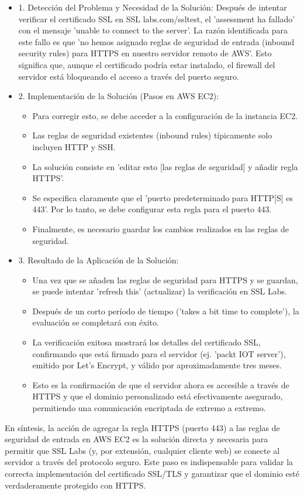 \documentclass{report}
\begin{document}
\begin{itemize}
    \item 1. Detección del Problema y Necesidad de la Solución: Después de intentar verificar el certificado SSL en SSL labs.com/ssltest, 
    el 'assessment ha fallado' con el mensaje 'unable to connect to the server'. La razón identificada para este fallo es que 'no hemos 
    asignado reglas de seguridad de entrada (inbound security rules) para HTTPS en nuestro servidor remoto de AWS'. Esto significa que, 
    aunque el certificado podría estar instalado, el firewall del servidor está bloqueando el acceso a través del puerto seguro.
    \item 2. Implementación de la Solución (Pasos en AWS EC2):
        \begin{itemize}
            \item Para corregir esto, se debe acceder a la configuración de la instancia EC2.
            \item Las reglas de seguridad existentes (inbound rules) típicamente solo incluyen HTTP y SSH.
            \item La solución consiste en 'editar esto [las reglas de seguridad] y añadir regla HTTPS'.
            \item Se especifica claramente que el 'puerto predeterminado para HTTP[S] es 443'. Por lo tanto, se debe configurar esta 
            regla para el puerto 443.
            \item Finalmente, es necesario guardar los cambios realizados en las reglas de seguridad.
        \end{itemize}
    \item 3. Resultado de la Aplicación de la Solución:
        \begin{itemize}
            \item Una vez que se añaden las reglas de seguridad para HTTPS y se guardan, se puede intentar 'refresh this' (actualizar) 
            la verificación en SSL Labs.
            \item Después de un corto período de tiempo ('takes a bit time to complete'), la evaluación se completará con éxito.
            \item La verificación exitosa mostrará los detalles del certificado SSL, confirmando que está firmado para el servidor 
            (ej. 'packt IOT server'), emitido por Let's Encrypt, y válido por aproximadamente tres meses.
            \item Esto es la confirmación de que el servidor ahora es accesible a través de HTTPS y que el dominio personalizado está 
            efectivamente asegurado, permitiendo una comunicación encriptada de extremo a extremo.
        \end{itemize}
\end{itemize}
En síntesis, la acción de agregar la regla HTTPS (puerto 443) a las reglas de seguridad de entrada en AWS EC2 es la solución directa y 
necesaria para permitir que SSL Labs (y, por extensión, cualquier cliente web) se conecte al servidor a través del protocolo seguro. 
Este paso es indispensable para validar la correcta implementación del certificado SSL/TLS y garantizar que el dominio esté verdaderamente 
protegido con HTTPS.
\end{document}
